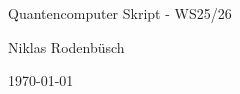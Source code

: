 \documentclass[a4paper,11pt]{article}
\begin{document}
\begin{center}
    {\huge Quantencomputer Skript - WS25/26\par}
    \vspace{0.5cm}
    {\large Niklas Rodenbüsch \par}
    \vspace{0.5cm}
    {\large \today \par}
\end{center}
\vspace{0.5cm}



\onehalfspacing
\captionsetup{justification=centering}







\end{document}
